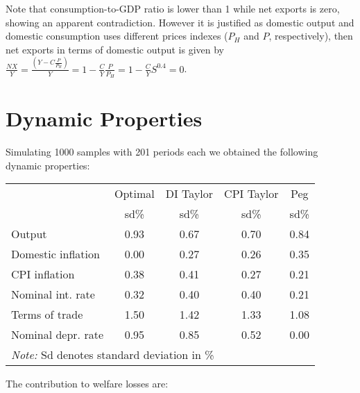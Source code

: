 \documentclass{article}
\begin{document}
Note that consumption-to-GDP ratio is lower than 1 while net exports is zero, showing an apparent contradiction. However it is justified as domestic output and domestic consumption uses different prices indexes ($P_H$ and $P$, respectively), then net exports in terms of domestic output is given by $\frac{NX}{Y} = \frac{(Y - C \frac{P}{P_H})}{Y} = 1 - \frac{C}{Y} \frac{P}{P_H} = 1 - \frac{C}{Y} S^{0.4} = 0 $.

\section{Dynamic Properties}

Simulating 1000 samples with 201 periods each we obtained the following dynamic properties:

\begin{table}[H]
    \centering
    \begin{tabular}{lcccc}
        \hline
        & Optimal & DI Taylor & CPI Taylor & Peg\\
        & sd\% & sd\% & sd\% & sd\% \\
        \hline
        Output & 0.93 & 0.67 & 0.70 & 0.84 \\
        Domestic inflation & 0.00 & 0.27 & 0.26 & 0.35 \\
        CPI inflation & 0.38 & 0.41 & 0.27 & 0.21 \\
        Nominal int. rate & 0.32 & 0.40 & 0.40 & 0.21 \\
        Terms of trade & 1.50 & 1.42 & 1.33 & 1.08 \\
        Nominal depr. rate & 0.95 & 0.85 & 0.52 & 0.00 \\
        \hline
        \multicolumn{5}{l}{\textit{Note: } Sd denotes standard deviation in \%}
    \end{tabular}
\end{table}

The contribution to welfare losses are:
\end{document}
